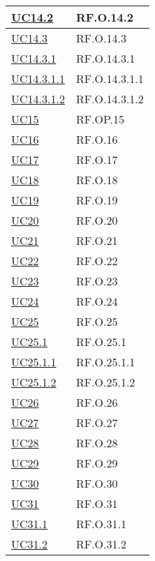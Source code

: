 \begin{adjustwidth}{-0.5cm}{-0.5cm}
\begin{longtable}{|P{4,5cm}|>{\arraybackslash}P{9cm}|}
    \hline
    \hyperref[UC14point2]{UC14.2} & RF.O.14.2 \\
    \hline
    \hyperref[UC14point3]{UC14.3} & RF.O.14.3 \\
    \hline
    \hyperref[UC14point3point1]{UC14.3.1} & RF.O.14.3.1 \\
    \hline
    \hyperref[UC14point3point1point1]{UC14.3.1.1} & RF.O.14.3.1.1 \\
    \hline
    \hyperref[UC14point3point1point2]{UC14.3.1.2} & RF.O.14.3.1.2 \\
    \hline
    \hyperref[UC15]{UC15} & RF.OP.15 \\
    \hline
    \hyperref[UC16]{UC16} & RF.O.16 \\
    \hline
    \hyperref[UC17]{UC17} & RF.O.17 \\
    \hline
    \hyperref[UC18]{UC18} & RF.O.18 \\
    \hline
    \hyperref[UC19]{UC19} & RF.O.19 \\
    \hline
    \hyperref[UC20]{UC20} & RF.O.20 \\
    \hline
    \hyperref[UC21]{UC21} & RF.O.21 \\
    \hline
    \hyperref[UC22]{UC22} & RF.O.22 \\
    \hline
    \hyperref[UC23]{UC23} & RF.O.23 \\
    \hline
    \hyperref[UC24]{UC24} & RF.O.24 \\
    \hline
    \hyperref[UC25]{UC25} & RF.O.25 \\
    \hline
    \hyperref[UC25point1]{UC25.1} & RF.O.25.1 \\
    \hline
    \hyperref[UC25point1point1]{UC25.1.1} & RF.O.25.1.1 \\
    \hline
    \hyperref[UC25poin1point2]{UC25.1.2} & RF.O.25.1.2 \\
    \hline
    \hyperref[UC26]{UC26} & RF.O.26 \\
    \hline
    \hyperref[UC27]{UC27} & RF.O.27 \\
    \hline
    \hyperref[UC28]{UC28} & RF.O.28 \\
    \hline
    \hyperref[UC29]{UC29} & RF.O.29 \\
    \hline
    \hyperref[UC30]{UC30} & RF.O.30 \\
    \hline
    \hyperref[UC31]{UC31} & RF.O.31 \\
    \hline
    \hyperref[UC31point1]{UC31.1} & RF.O.31.1 \\
    \hline
    \hyperref[UC31point2]{UC31.2} & RF.O.31.2 \\

\end{longtable}
\end{adjustwidth}
